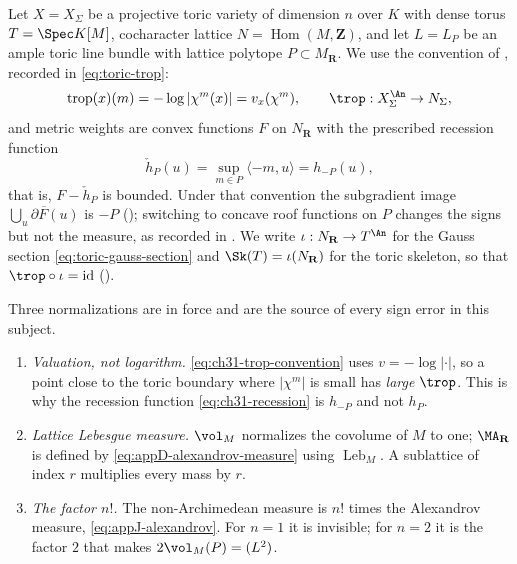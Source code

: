 Let \(X=X_\Sigma\) be a projective toric variety of dimension \(n\) over
\(K\) with dense torus \(T=\Spec K[M]\), cocharacter lattice
\(N=\operatorname{Hom}(M,\mathbf Z)\), and let \(L=L_P\) be an ample toric
line bundle with lattice polytope \(P\subset M_\mathbf R\).  We use the
convention of , recorded in
\eqref{eq:toric-trop}:
\begin{equation}
\label{eq:ch31-trop-convention}
 \operatorname{trop}(x)(m)=-\log|\chi^m(x)|=v_x(\chi^m),
 \qquad
 \trop:X_\Sigma^{\An}\to N_\Sigma ,
\end{equation}
and metric weights are convex functions \(F\) on \(N_\mathbf R\) with the
prescribed recession function
\begin{equation}
\label{eq:ch31-recession}
 \check h_P(u)=\sup_{m\in P}\langle-m,u\rangle=h_{-P}(u),
\end{equation}
that is, \(F-\check h_P\) is bounded.  Under that convention the subgradient
image \(\overline{\bigcup_u\partial F(u)}\) is \(-P\)
(); switching to concave roof functions on
\(P\) changes the signs but not the measure, as recorded in
.  We write \(\iota:N_\mathbf R\to T^{\An}\) for the
Gauss section \eqref{eq:toric-gauss-section} and \(\Sk(T)=\iota(N_\mathbf R)\)
for the toric skeleton, so that \(\trop\circ\iota=\operatorname{id}\)
().

Three normalizations are in force and are the source of every sign error in
this subject.

\begin{enumerate}
\item\label{itm:ch31-toric:trop}
 \emph{Valuation, not logarithm.}  \eqref{eq:ch31-trop-convention} uses
 \(v=-\log|\cdot|\), so a point close to the toric boundary where
 \(|\chi^m|\) is small has \emph{large} \(\trop\).  This is why the
 recession function \eqref{eq:ch31-recession} is \(h_{-P}\) and not
 \(h_P\).
\item\label{itm:ch31-toric:lattice}
 \emph{Lattice Lebesgue measure.}  \(\vol_M\) normalizes the covolume of
 \(M\) to one; \(\MA_{\mathbf R}\) is defined by
 \eqref{eq:appD-alexandrov-measure} using \(\operatorname{Leb}_M\).  A
 sublattice of index \(r\) multiplies every mass by \(r\).
\item\label{itm:ch31-toric:factorial}
 \emph{The factor \(n!\).}  The non-Archimedean measure is \(n!\) times the
 Alexandrov measure, \eqref{eq:appJ-alexandrov}.  For \(n=1\) it is
 invisible; for \(n=2\) it is the factor \(2\) that makes
 \(2\vol_M(P)=(L^2)\).
\end{enumerate}

